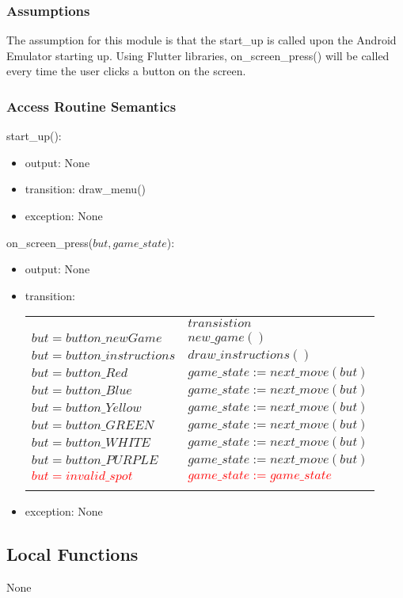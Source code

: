 \documentclass[12pt]{article}
\begin{document}
\subsubsection* {Assumptions}
The assumption for this module is that the start\_up is called upon the Android Emulator starting up. Using Flutter libraries, on\_screen\_press() will be called every time the user clicks a button on the screen.

\subsubsection* {Access Routine Semantics}

\noindent start\_up():
\begin{itemize}
\item output: None
\item transition: draw\_menu()
  
\item exception: None
\end{itemize}

\noindent on\_screen\_press($but, game\_state$):
\begin{itemize}
    \item output: None
    \item transition: 
    \begin{tabular}{|p{3.5cm}|l|}
\hhline{~|-|}
\multicolumn{1}{r|}{} & \multicolumn{1}{l|}{$transistion$}\\
\hhline{|-|-|}
$but = button\_newGame$ & $new\_game()$\\
\hhline{|-|-|}
$but = button\_instructions$ & $draw\_instructions()$\\
\hhline{|-|-|}
$but = button\_Red$ & $game\_state := next\_move(but)$\\
\hhline{|-|-|}
$but = button\_Blue$ & $game\_state := next\_move(but)$\\
\hhline{|-|-|}
$but = button\_Yellow$ & $game\_state := next\_move(but)$\\
\hhline{|-|-|}
$but = button\_GREEN$ & $game\_state := next\_move(but)$\\
\hhline{|-|-|}
$but = button\_WHITE$ & $game\_state := next\_move(but)$\\
\hhline{|-|-|}
$but = button\_PURPLE$ & $game\_state := next\_move(but)$\\
\hhline{|-|-|}
\textcolor{red}{$but = invalid\_spot$} & \textcolor{red}{$game\_state := game\_state$}\\
\hhline{|-|-|}
\end{tabular}

    \item exception: None
\end{itemize}


\subsection*{Local Functions}
None
\newpage
\end{document}
